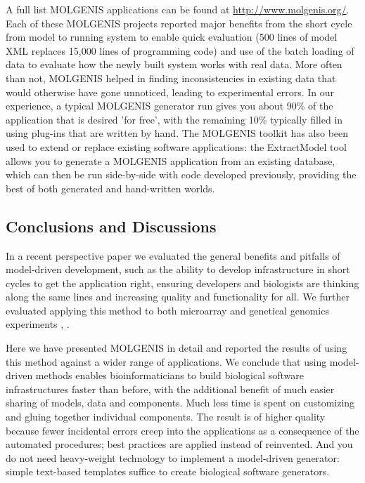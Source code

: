 A full list MOLGENIS applications can be found at \url{http://www.molgenis.org/}. Each of these MOLGENIS projects 
reported major benefits from the short cycle from model to running system to enable quick evaluation 
(500 lines of model XML replaces 15,000 lines of programming code) and use of the batch loading of 
data to evaluate how the newly built system works with real data. More often than not, MOLGENIS 
helped in finding inconsistencies in existing data that would otherwise have gone unnoticed, leading 
to experimental errors. In our experience, a typical MOLGENIS generator run gives you about 90\% of 
the application that is desired 'for free', with the remaining 10\% typically filled in using plug-ins 
that are written by hand. The MOLGENIS toolkit has also been used to extend or replace existing 
software applications: the ExtractModel tool allows you to generate a MOLGENIS application from an 
existing database, which can then be run side-by-side with code developed previously, providing the 
best of both generated and hand-written worlds.

\subsection{Conclusions and Discussions}
In a recent perspective paper \cite{Swertz:2007} we evaluated the general benefits and pitfalls of model-driven 
development, such as the ability to develop infrastructure in short cycles to get the application 
right, ensuring developers and biologists are thinking along the same lines and increasing quality 
and functionality for all. We further evaluated applying this method to both microarray and genetical 
genomics experiments \cite{Swertz:2004}, \cite{Swertz:2010a}.

Here we have presented MOLGENIS in detail and reported the results of using this method against a 
wider range of applications. We conclude that using model-driven methods enables bioinformaticians 
to build biological software infrastructures faster than before, with the additional benefit of 
much easier sharing of models, data and components. Much less time is spent on customizing and gluing 
together individual components. The result is of higher quality because fewer incidental errors creep 
into the applications as a consequence of the automated procedures; best practices are applied 
instead of reinvented. And you do not need heavy-weight technology to implement a model-driven 
generator: simple text-based templates suffice to create biological software generators.

